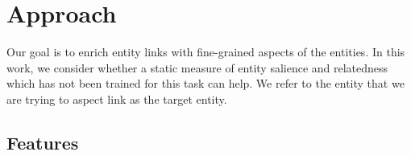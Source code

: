 \section{Approach}
\label{sec:Approach}
Our goal is to enrich entity links with fine-grained aspects of the entities. In this work, we consider whether a static measure of entity salience and relatedness which has not been trained for this task can help. We refer to the entity that we are trying to aspect link as the target entity.


\subsection{Features}
\label{subsec:Features}

